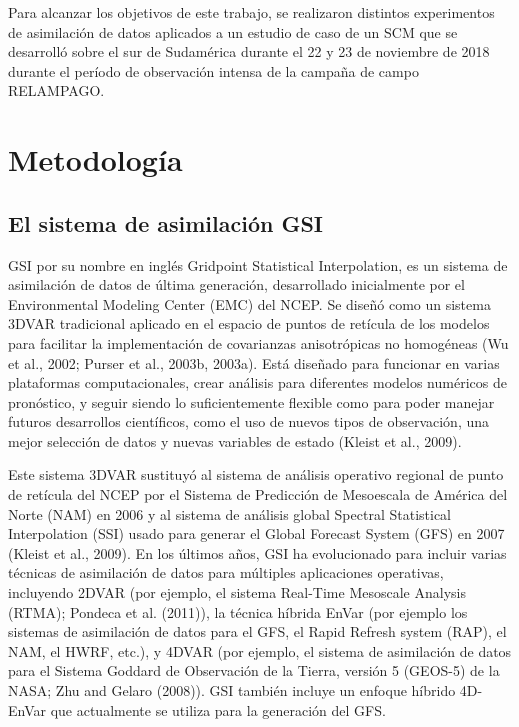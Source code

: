 \documentclass[12pt,twoside]{reedthesis}
\begin{document}
Para alcanzar los objetivos de este trabajo, se realizaron distintos experimentos de asimilación de datos aplicados a un estudio de caso de un SCM que se desarrolló sobre el sur de Sudamérica durante el 22 y 23 de noviembre de 2018 durante el período de observación intensa de la campaña de campo RELAMPAGO.

\hypertarget{metodologia}{%
\chapter{Metodología}\label{metodologia}}

\hypertarget{el-sistema-de-asimilaciuxf3n-gsi}{%
\section{El sistema de asimilación GSI}\label{el-sistema-de-asimilaciuxf3n-gsi}}

GSI por su nombre en inglés Gridpoint Statistical Interpolation, es un sistema de asimilación de datos de última generación, desarrollado inicialmente por el Environmental Modeling Center (EMC) del NCEP. Se diseñó como un sistema 3DVAR tradicional aplicado en el espacio de puntos de retícula de los modelos para facilitar la implementación de covarianzas anisotrópicas no homogéneas (Wu et al., 2002; Purser et al., 2003b, 2003a).
Está diseñado para funcionar en varias plataformas computacionales, crear análisis para diferentes modelos numéricos de pronóstico, y seguir siendo lo suficientemente flexible como para poder manejar futuros desarrollos científicos, como el uso de nuevos tipos de observación, una mejor selección de datos y nuevas variables de estado (Kleist et al., 2009).

Este sistema 3DVAR sustituyó al sistema de análisis operativo regional de punto de retícula del NCEP por el Sistema de Predicción de Mesoescala de América del Norte (NAM) en 2006 y al sistema de análisis global Spectral Statistical Interpolation (SSI) usado para generar el Global Forecast System (GFS) en 2007 (Kleist et al., 2009).
En los últimos años, GSI ha evolucionado para incluir varias técnicas de asimilación de datos para múltiples aplicaciones operativas, incluyendo 2DVAR (por ejemplo, el sistema Real-Time Mesoscale Analysis (RTMA); Pondeca et al. (2011)), la técnica híbrida EnVar (por ejemplo los sistemas de asimilación de datos para el GFS, el Rapid Refresh system (RAP), el NAM, el HWRF, etc.), y 4DVAR (por ejemplo, el sistema de asimilación de datos para el Sistema Goddard de Observación de la Tierra, versión 5 (GEOS-5) de la NASA; Zhu and Gelaro (2008)).
GSI también incluye un enfoque híbrido 4D-EnVar que actualmente se utiliza para la generación del GFS.
\end{document}
